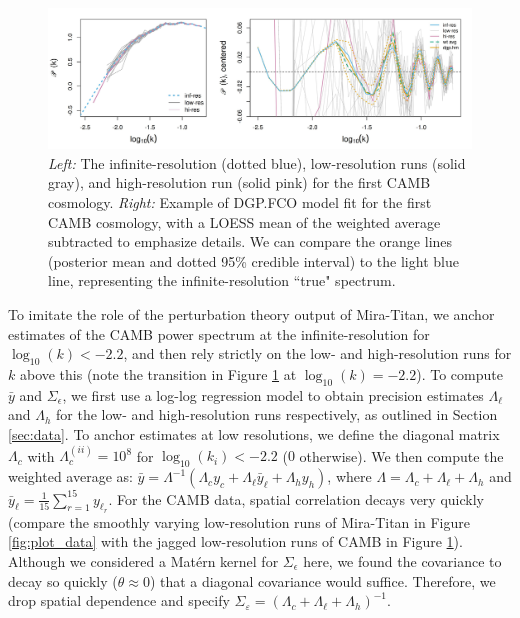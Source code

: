 \documentclass[11pt]{article}
\begin{document}
\begin{figure}
    \centering
    \includegraphics[width=\textwidth]{CAMB_fit_model1.jpeg}
    \caption{{\it Left:} The infinite-resolution (dotted blue), 
             low-resolution runs (solid gray), and high-resolution run (solid pink) 
             for the first CAMB cosmology.
             {\it Right:} Example of DGP.FCO model fit for the first CAMB cosmology, 
             with a LOESS mean of the 
             weighted average subtracted to emphasize details. We can 
             compare the orange lines (posterior mean and dotted 95\% credible interval) to the 
             light blue line, representing the infinite-resolution ``true" spectrum.}   
    \label{fig:fit_camb}
\end{figure}

To imitate the role of the perturbation theory output of Mira-Titan, we anchor 
estimates of the CAMB power spectrum at the infinite-resolution for 
$\log_{10}(k) < -2.2$, and then rely strictly on the low- and high-resolution 
runs for $k$ above this (note the transition
in Figure \ref{fig:fit_camb} at $\log_{10}(k) = -2.2$). To compute $\bar{y}$ and $\Sigma_\epsilon$,
we first use a log-log regression model to obtain precision estimates $\Lambda_\ell$ and $\Lambda_h$
for the low- and high-resolution runs respectively, as outlined in Section \ref{sec:data}. 
To anchor estimates at low resolutions, we define the diagonal matrix $\Lambda_c$ with 
$\Lambda_c^{(ii)}=10^8$ for $\log_{10}(k_i) < -2.2$ ($0$ otherwise).
We then compute the weighted average as: $\bar y = \Lambda^{-1}(\Lambda_c y_c + 
\Lambda_{\ell} \bar{y}_\ell + \Lambda_h y_h)$, where $\Lambda = \Lambda_c + \Lambda_\ell + \Lambda_h$ 
and $\bar{y}_\ell = \frac{1}{15}\sum_{r=1}^{15} y_{\ell_r}$.
For the CAMB data, spatial correlation decays very quickly
(compare the smoothly varying low-resolution runs of Mira-Titan in Figure \ref{fig:plot_data} 
with the jagged low-resolution runs of CAMB in Figure \ref{fig:fit_camb}). 
Although we considered a Mat\'ern kernel for $\Sigma_\epsilon$ here, we found the covariance
to decay so quickly ($\theta\approx 0$) that a diagonal covariance would suffice.
Therefore, we drop spatial dependence and specify $\Sigma_\varepsilon = 
(\Lambda_c+\Lambda_\ell+\Lambda_h)^{-1}$.  
\end{document}
